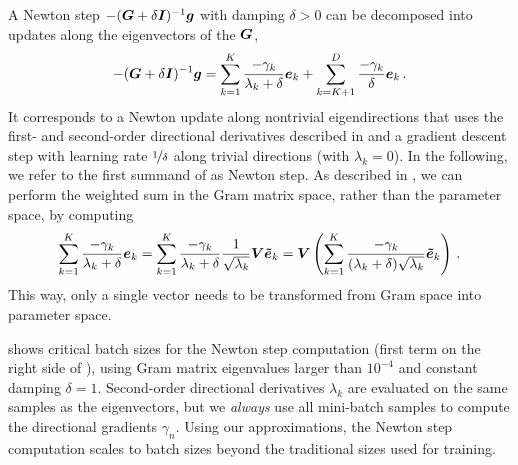 A Newton step $-({\bm{G}} + \delta {\bm{I}})^{-1} {\bm{g}}$ with damping $\delta > 0$ can be
decomposed into updates along the eigenvectors of the \ggn ${\bm{G}}$,
\begin{equation}
  \label{vivit::eq:newton-step}
  -({\bm{G}} + \delta {\bm{I}})^{-1} {\bm{g}}
=
   \sum_{k=1}^{K} \frac{- \gamma_{k}}{\lambda_{k} + \delta} {\bm{e}}_{k}
  + \sum_{k = K + 1}^{D} \frac{-\gamma_{k}}{\delta} {\bm{e}}_{k}\,.
\end{equation}
It corresponds to a Newton update along nontrivial eigendirections that uses the
first- and second-order directional derivatives described in
 and a gradient descent step with learning rate
$\nicefrac{1}{\delta}$ along trivial directions (with $\lambda_k = 0$). In the
following, we refer to the first summand of  as Newton
step. As described in , we can perform the weighted
sum in the Gram matrix space, rather than the parameter space, by computing
\begin{equation*}
  \sum_{k=1}^{K} \frac{- \gamma_{k}}{\lambda_{k} + \delta} {\bm{e}}_{k}
  =
  \sum_{k=1}^{K} \frac{- \gamma_{k}}{\lambda_{k} + \delta} \frac{1}{\sqrt{\lambda_{k}}} {\bm{V}} \bm{\tilde{e}}_{k}
  ={\bm{V}} \left(
    \sum_{k=1}^{K} \frac{- \gamma_{k}}{(\lambda_{k} + \delta)\sqrt{\lambda_{k}}} \bm{\tilde{e}}_{k}
  \right)\,.
\end{equation*}
This way, only a single vector needs to be transformed from Gram space into
parameter space.

 shows critical batch sizes for the Newton step
computation (first term on the right side of ),
using Gram matrix eigenvalues larger than $10^{-4}$ and constant damping
$\delta=1$. Second-order directional derivatives $\lambda_{k}$ are evaluated on
the same samples as the \ggn eigenvectors, but we \emph{always} use all
mini-batch samples to compute the directional gradients $\gamma_{n}$. Using our
approximations, the Newton step computation scales to batch sizes beyond the
traditional sizes used for training.




